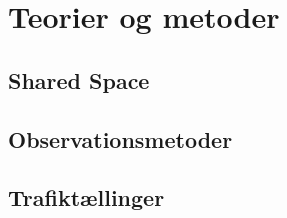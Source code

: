 \chapter{Teorier og metoder}
\label{chap:Teorier og metoder}

\section{Shared Space}
\label{sec:Shared Space}

\section{Observationsmetoder}
\label{sec:Observationsmetoder}

\section{Trafiktællinger}
\label{sec:Trafiktællinger}
